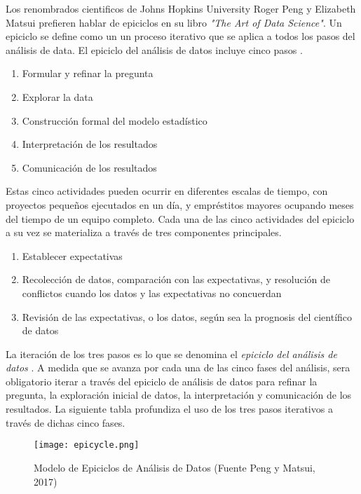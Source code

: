 Los renombrados cientificos de Johns Hopkins University Roger Peng y Elizabeth Matsui prefieren hablar de epiciclos en su libro \emph{"The Art of Data Science"}. Un epiciclo se define como un un proceso iterativo que se aplica a todos los pasos del análisis de data. El epiciclo del análisis de datos incluye cinco pasos \cite{pengMatsui}.

\begin{enumerate}
	\item Formular y refinar la pregunta
	\item Explorar la data
	\item Construcción formal del modelo estadístico
	\item Interpretación de los resultados
	\item Comunicación de los resultados
\end{enumerate}

Estas cinco actividades pueden ocurrir en diferentes escalas de tiempo, con proyectos pequeños ejecutados en un día, y empréstitos mayores ocupando meses del tiempo de un equipo completo. Cada una de las cinco actividades del epiciclo a su vez se materializa a través de tres componentes principales.

\begin{enumerate}
	\item Establecer expectativas
	\item Recolección de datos, comparación con las expectativas, y resolución de conflictos cuando los datos y las expectativas no concuerdan
	\item Revisión de las expectativas, o los datos, según sea la prognosis del científico de datos
\end{enumerate}

La iteración de los tres pasos es lo que se denomina el \emph{epiciclo del análisis de datos} \cite{pengMatsui}. A medida que se avanza por cada una de las cinco fases del análisis, sera obligatorio iterar a través del epiciclo de análisis de datos para refinar la pregunta, la exploración inicial de datos, la interpretación y comunicación de los resultados. La siguiente tabla profundiza el uso de los tres pasos iterativos a través de dichas cinco fases.

\begin{figure}[h!]
	\centering
	\texttt{[image: epicycle.png]}
	\caption{Modelo de Epiciclos de Análisis de Datos (Fuente Peng y Matsui, 2017)}
\end{figure}

